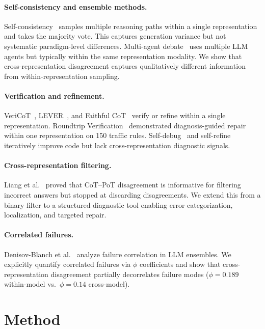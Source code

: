\documentclass[11pt,a4paper]{article}
\begin{document}
\paragraph{Self-consistency and ensemble methods.}
Self-consistency~\cite{wang2023selfconsistency} samples multiple reasoning paths within a single representation and takes the majority vote.
This captures generation variance but not systematic paradigm-level differences.
Multi-agent debate~\cite{du2023improving,liang2024encouraging} uses multiple LLM agents but typically within the same representation modality.
We show that cross-representation disagreement captures qualitatively different information from within-representation sampling.

\paragraph{Verification and refinement.}
VeriCoT~\cite{vericot2024}, LEVER~\cite{ni2023lever}, and Faithful CoT~\cite{lyu2023faithful} verify or refine within a single representation.
Roundtrip Verification~\cite{roundtrip2026} demonstrated diagnosis-guided repair within one representation on 150 traffic rules.
Self-debug~\cite{chen2024teaching} and self-refine~\cite{madaan2024selfrefine} iteratively improve code but lack cross-representation diagnostic signals.

\paragraph{Cross-representation filtering.}
Liang et al.~\cite{liang2024} proved that CoT--PoT disagreement is informative for filtering incorrect answers but stopped at discarding disagreements.
We extend this from a binary filter to a structured diagnostic tool enabling error categorization, localization, and targeted repair.

\paragraph{Correlated failures.}
Denisov-Blanch et al.~\cite{denisov2026} analyze failure correlation in LLM ensembles.
We explicitly quantify correlated failures via $\phi$ coefficients and show that cross-representation disagreement partially decorrelates failure modes ($\phi{=}0.189$ within-model vs.\ $\phi{=}0.14$ cross-model).

\section{Method}
\end{document}
